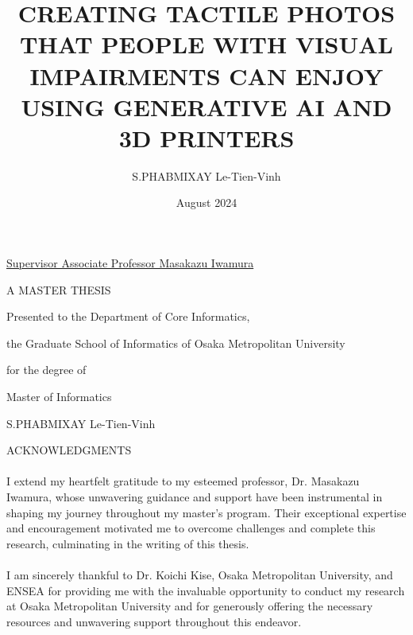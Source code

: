 \documentclass[12pt, letterpaper]{article}
\title{CREATING TACTILE PHOTOS THAT PEOPLE WITH VISUAL IMPAIRMENTS CAN ENJOY USING GENERATIVE AI AND 3D PRINTERS}
\author{S.PHABMIXAY Le-Tien-Vinh}
\date{August 2024}
\begin{document}
\maketitle

\begin{center}

    \vspace{2cm}
    \underline{Supervisor      Associate Professor Masakazu Iwamura}
    \vspace{4cm}
    
    A MASTER THESIS
    \vspace{1cm}
    
    Presented to the Department of Core Informatics,
    
    the Graduate School of Informatics of Osaka Metropolitan University
    
    for the degree of
    
    Master of Informatics
    
\end{center}


\newpage 

\vspace*{\fill}
\begin{center}
    \textcopyright S.PHABMIXAY Le-Tien-Vinh
\end{center}
\vspace*{\fill}

\newpage

\begin{center}
    ACKNOWLEDGMENTS
\end{center}
\vspace{1cm}
\paragraph{}
I extend my heartfelt gratitude to my esteemed professor, Dr. Masakazu Iwamura, whose unwavering guidance and support have been instrumental in shaping my journey throughout
my master’s program. Their exceptional expertise and encouragement motivated me to overcome challenges and complete this research, culminating in the writing of this thesis.
\paragraph{}
I am sincerely thankful to Dr. Koichi Kise, Osaka Metropolitan University, and ENSEA for providing me with the invaluable opportunity to conduct my research at
Osaka Metropolitan University and for generously offering the necessary resources and unwavering support throughout this endeavor.
\end{document}
